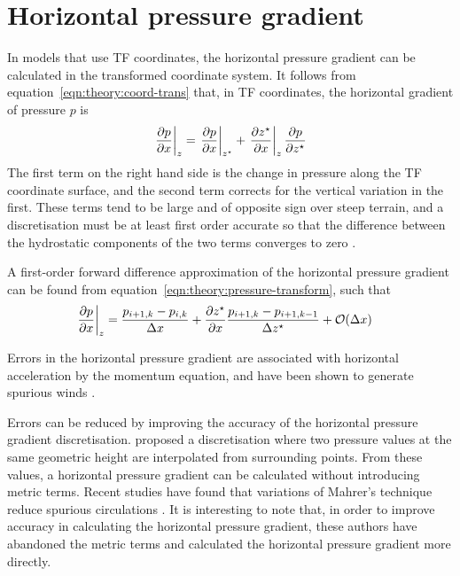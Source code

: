 \section{Horizontal pressure gradient}
In models that use TF coordinates, the horizontal pressure gradient can be calculated in the transformed coordinate system.  It follows from equation~\ref{eqn:theory:coord-trans} that, in TF coordinates, the horizontal gradient of pressure $p$ is \autocite{mahrer1984}
\begin{align}
	\left. \frac{\partial p}{\partial x} \right|_z = 
	\left. \frac{\partial p}{\partial x} \right|_{z^\star} + 
	\left. \frac{\partial {z^\star}}{\partial x} \right|_z
	\frac{\partial p}{\partial {z^\star}} \label{eqn:theory:pressure-transform}
\end{align}
The first term on the right hand side is the change in pressure along the TF coordinate surface, and the second term corrects for the vertical variation in the first.  These terms tend to be large and of opposite sign over steep terrain, and a discretisation must be at least first order accurate so that the difference between the hydrostatic components of the two terms converges to zero \autocite{gary1973}.

A first-order forward difference approximation of the horizontal pressure gradient can be found from equation~\ref{eqn:theory:pressure-transform}, such that
\begin{align}
	\left. \frac{\partial p}{\partial x} \right|_z &= \frac{p_{i+1,k} - p_{i,k}}{\Delta x} + \frac{\partial {z^\star}}{\partial x} \frac{p_{i+1,k} - p_{i+1,k-1}}{\Delta {z^\star}} + \mathcal{O}(\Delta x)
\end{align}

Errors in the horizontal pressure gradient are associated with horizontal acceleration by the momentum equation, and have been shown to generate spurious winds \parencites{klemp2003}{klemp2011}.

Errors can be reduced by improving the accuracy of the horizontal pressure gradient discretisation.  \textcite{mahrer1984} proposed a discretisation where two pressure values at the same geometric height are interpolated from surrounding points.  From these values, a horizontal pressure gradient can be calculated without introducing metric terms.  Recent studies have found that variations of Mahrer's technique reduce spurious circulations \parencites{dempsey-davis1998}{klemp2011}{zaengl2012}.  It is interesting to note that, in order to improve accuracy in calculating the horizontal pressure gradient, these authors have abandoned the metric terms and calculated the horizontal pressure gradient more directly.
